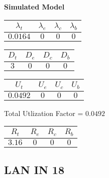 \documentclass{article}
\begin{document}
\begin{minipage}{0.5\textwidth}
\centering	\textbf{Simulated Model}
\begin{table}[H]
\centering
\begin{tabular}{@{}cccc@{}}
\toprule
$\lambda_t$ & $\lambda_e$ & $\lambda_c$ & $\lambda_b$\\
\midrule
$0.0164$ & $0$ & $0$ & $0$\\
\bottomrule
\end{tabular}
\end{table}
\begin{table}[H]
\centering
\begin{tabular}{@{}cccc@{}}
\toprule
$D_t$ & $D_e$ & $D_c$ & $D_b$\\
\midrule
$3$ & $0$ & $0$ & $0$\\
\bottomrule
\end{tabular}
\end{table}\begin{table}[H]
\centering
\begin{tabular}{@{}cccc@{}}
\toprule
$U_t$ & $U_e$ & $U_c$ & $U_b$\\
\midrule
$0.0492$ & $0$ & $0$ & $0$\\
\bottomrule
\end{tabular}
\end{table}
\centering Total Utlization Factor = $0.0492$
\begin{table}[H]
\centering
\begin{tabular}{@{}cccc@{}}
\toprule
$R_t$ & $R_e$ & $R_c$ & $R_b$\\
\midrule
$3.16$ & $0$ & $0$ & $0$\\
\bottomrule
\end{tabular}
\end{table}
\end{minipage}\subsection{LAN IN 18}
\end{document}
